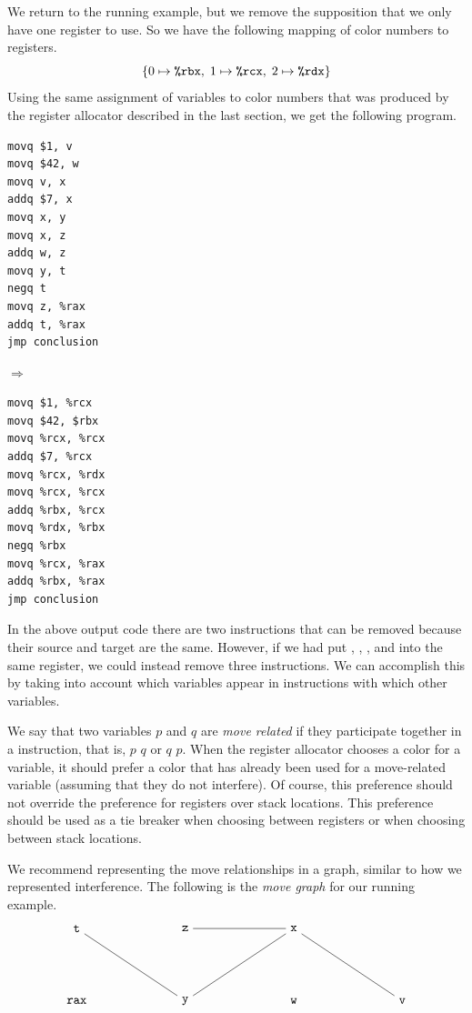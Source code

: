 \documentclass[11pt]{book}
\begin{document}
We return to the running example, but we remove the supposition that
we only have one register to use. So we have the following mapping of
color numbers to registers.
\[
  \{ 0 \mapsto \texttt{\%rbx}, \; 1 \mapsto \texttt{\%rcx}, \; 2 \mapsto \texttt{\%rdx} \}
\]
Using the same assignment of variables to color numbers that was
produced by the register allocator described in the last section, we
get the following program.

\begin{minipage}{0.3\textwidth}
\begin{lstlisting}
movq $1, v
movq $42, w
movq v, x
addq $7, x
movq x, y
movq x, z
addq w, z
movq y, t
negq t
movq z, %rax
addq t, %rax
jmp conclusion
\end{lstlisting}
\end{minipage}
$\Rightarrow\qquad$
\begin{minipage}{0.45\textwidth}
\begin{lstlisting}
movq $1, %rcx
movq $42, $rbx
movq %rcx, %rcx
addq $7, %rcx
movq %rcx, %rdx
movq %rcx, %rcx
addq %rbx, %rcx
movq %rdx, %rbx
negq %rbx
movq %rcx, %rax
addq %rbx, %rax
jmp conclusion
\end{lstlisting}
\end{minipage}

In the above output code there are two  instructions that
can be removed because their source and target are the same.  However,
if we had put , , , and  into the same
register, we could instead remove three  instructions.  We
can accomplish this by taking into account which variables appear in
 instructions with which other variables.

We say that two variables $p$ and $q$ are \emph{move
  related} if they participate together in a
 instruction, that is,  $p$\key{,} $q$ or
 $q$\key{,} $p$. When the register allocator chooses a color
for a variable, it should prefer a color that has already been used
for a move-related variable (assuming that they do not interfere). Of
course, this preference should not override the preference for
registers over stack locations. This preference should be used as a
tie breaker when choosing between registers or when choosing between
stack locations.

We recommend representing the move relationships in a graph, similar
to how we represented interference.  The following is the \emph{move
  graph} for our running example.
\[
\begin{tikzpicture}[baseline=(current  bounding  box.center)]
\node (rax) at (0,0) {$\ttm{rax}$};
\node (t) at (0,2) {$\ttm{t}$};
\node (z) at (3,2)  {$\ttm{z}$};
\node (x) at (6,2)  {$\ttm{x}$};
\node (y) at (3,0)  {$\ttm{y}$};
\node (w) at (6,0)  {$\ttm{w}$};
\node (v) at (9,0)  {$\ttm{v}$};

\draw (v) to (x);
\draw (x) to (y);
\draw (x) to (z);
\draw (y) to (t);
\end{tikzpicture}
\]
\end{document}
